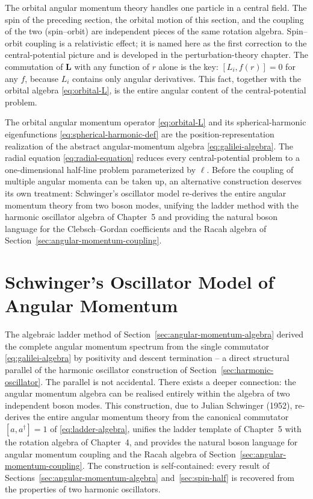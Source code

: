 \begin{note}
  The orbital angular momentum theory handles one particle in a central field. The spin of the preceding section, the orbital motion of this section, and the coupling of the two (spin--orbit) are independent pieces of the same rotation algebra. Spin--orbit coupling is a relativistic effect; it is named here as the first correction to the central-potential picture and is developed in the perturbation-theory chapter. The commutation of $\bm L$ with any function of $r$ alone is the key: $[L_i, f(r)] = 0$ for any $f$, because $L_i$ contains only angular derivatives. This fact, together with the orbital algebra \eqref{eq:orbital-L}, is the entire angular content of the central-potential problem.
\end{note}

The orbital angular momentum operator \eqref{eq:orbital-L} and its spherical-harmonic eigenfunctions \eqref{eq:spherical-harmonic-def} are the position-representation realization of the abstract angular-momentum algebra \eqref{eq:galilei-algebra}. The radial equation \eqref{eq:radial-equation} reduces every central-potential problem to a one-dimensional half-line problem parameterized by $\ell$. Before the coupling of multiple angular momenta can be taken up, an alternative construction deserves its own treatment: Schwinger's oscillator model re-derives the entire angular momentum theory from two boson modes, unifying the ladder method with the harmonic oscillator algebra of Chapter~5 and providing the natural boson language for the Clebsch--Gordan coefficients and the Racah algebra of Section~\ref{sec:angular-momentum-coupling}.

\section{Schwinger's Oscillator Model of Angular Momentum}
\label{sec:schwinger-model}

The algebraic ladder method of Section~\ref{sec:angular-momentum-algebra} derived the complete angular momentum spectrum from the single commutator \eqref{eq:galilei-algebra} by positivity and descent termination -- a direct structural parallel of the harmonic oscillator construction of Section~\ref{sec:harmonic-oscillator}. The parallel is not accidental. There exists a deeper connection: the angular momentum algebra can be realised entirely within the algebra of two independent boson modes. This construction, due to Julian Schwinger (1952), re-derives the entire angular momentum theory from the canonical commutator $[a,a^\dagger]=1$ of \eqref{eq:ladder-algebra}, unifies the ladder template of Chapter~5 with the rotation algebra of Chapter~4, and provides the natural boson language for angular momentum coupling and the Racah algebra of Section~\ref{sec:angular-momentum-coupling}. The construction is self-contained: every result of Sections~\ref{sec:angular-momentum-algebra} and~\ref{sec:spin-half} is recovered from the properties of two harmonic oscillators.

